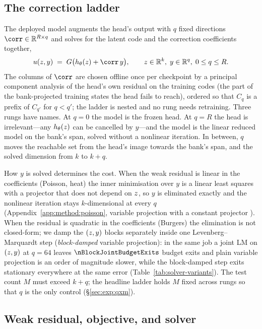 \subsection{The correction ladder}
\label{sec:method:ladder}

The deployed model augments the head's output with $q$ fixed directions
$\corr\in\Real^{R\times q}$ and solves for the latent code and the correction
coefficients together,
\begin{equation}
  \umanifold(\latent,y) \;=\; \bank\big(\head(\latent) + \corr\,y\big),
  \qquad \latent\in\Real^{k},\; y\in\Real^{q},\; 0\le q\le R .
  \label{eq:ladder}
\end{equation}
The columns of $\corr$ are chosen offline once per checkpoint by a principal
component analysis of the head's own residual on the training codes (the part of
the bank-projected training states the head fails to reach), ordered so that
$C_{q}$ is a prefix of $C_{q'}$ for $q<q'$; the ladder is nested and no rung
needs retraining. Three rungs have names. At $q=0$ the model is the frozen
head. At $q=R$ the head is irrelevant---any $h_\theta(z)$ can be cancelled
by $y$---and the model is the linear reduced model on the bank's span, solved
without a nonlinear iteration. In between, $q$ moves the reachable set from the
head's image towards the bank's span, and the solved dimension from $k$ to
$k+q$.

How $y$ is solved determines the cost. When the weak residual is linear in the
coefficients (Poisson, heat) the inner minimisation over $y$ is a linear least
squares with a projector that does not depend on $z$, so $y$ is eliminated
exactly and the nonlinear iteration stays $k$-dimensional at every $q$
(Appendix~\ref{app:method:poisson}, variable projection with a constant
projector \citep{GolubPereyra1973}). When the residual is quadratic in the
coefficients (Burgers) the elimination is not closed-form; we damp the
$(z,y)$ blocks separately inside one Levenberg--Marquardt step
(\emph{block-damped} variable projection): in the same job a joint LM on
$(z,y)$ at $q=64$ leaves $\nBlockJointBudgetExits$ budget exits and plain
variable projection is an order of magnitude slower, while the block-damped
step exits stationary everywhere at the same error
(Table~\ref{tab:solver-variants}). The test count $M$ must exceed $k+q$; the headline ladder holds $M$
fixed across rungs so that $q$ is the only control (\S\ref{sec:exp:qxm}).

\subsection{Weak residual, objective, and solver}
\label{sec:method:weak}

